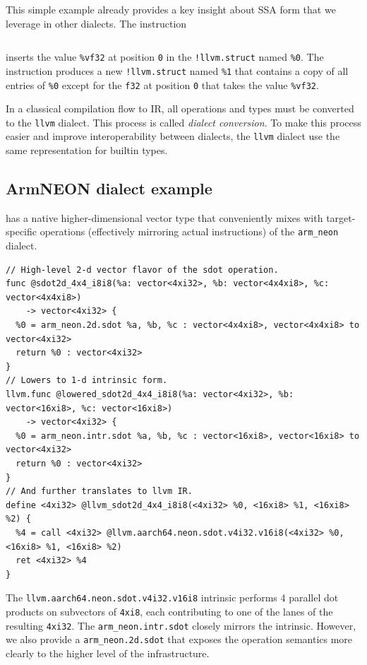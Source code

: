 This simple example already provides a key insight about SSA form that we leverage in other dialects.
The instruction
\begin{lstlisting}[language=mlir]
%1 = llvm.insertvalue %vf32, %0[0] : !llvm.struct<(f32, vector<2xf32>, i32)>
\end{lstlisting}
inserts the value \lstinline|%vf32| at position \lstinline|0| in the 
\lstinline|!llvm.struct| named \lstinline|%0|. The instruction produces a new \lstinline|!llvm.struct| named \lstinline|%1| that contains a copy of all entries of \lstinline|%0| except for the \lstinline|f32| at position \lstinline|0| that takes the value \lstinline|%vf32|.

In a classical compilation flow to \LLVM IR, all operations and types must be converted to the \lstinline|llvm| dialect. This process is called \emph{dialect conversion}.
To make this process easier and improve interoperability between dialects, the \lstinline|llvm| dialect use the same representation for builtin types. 

\subsection{ArmNEON dialect example}
\label{sec:appendix-arm-neon-example}

\MLIR has a native higher-dimensional vector type that conveniently mixes with target-specific operations (effectively mirroring actual instructions) of the \lstinline|arm_neon| dialect.

\begin{lstlisting}[language=mlir]
// High-level 2-d vector flavor of the sdot operation.
func @sdot2d_4x4_i8i8(%a: vector<4xi32>, %b: vector<4x4xi8>, %c: vector<4x4xi8>) 
    -> vector<4xi32> {
  %0 = arm_neon.2d.sdot %a, %b, %c : vector<4x4xi8>, vector<4x4xi8> to vector<4xi32>
  return %0 : vector<4xi32>
}
// Lowers to 1-d intrinsic form.
llvm.func @lowered_sdot2d_4x4_i8i8(%a: vector<4xi32>, %b: vector<16xi8>, %c: vector<16xi8>) 
    -> vector<4xi32> {
  %0 = arm_neon.intr.sdot %a, %b, %c : vector<16xi8>, vector<16xi8> to vector<4xi32>
  return %0 : vector<4xi32>
}
// And further translates to llvm IR.
define <4xi32> @llvm_sdot2d_4x4_i8i8(<4xi32> %0, <16xi8> %1, <16xi8> %2) {
  %4 = call <4xi32> @llvm.aarch64.neon.sdot.v4i32.v16i8(<4xi32> %0, <16xi8> %1, <16xi8> %2)
  ret <4xi32> %4
}
\end{lstlisting}

The \lstinline|llvm.aarch64.neon.sdot.v4i32.v16i8| intrinsic performs 4 parallel dot products
on subvectors of \lstinline|4xi8|, each contributing to one of the lanes of the resulting \lstinline|4xi32|. The \lstinline|arm_neon.intr.sdot| closely mirrors the intrinsic.
However, we also provide a \lstinline|arm_neon.2d.sdot| that exposes the operation semantics more clearly to the higher level of the infrastructure.

